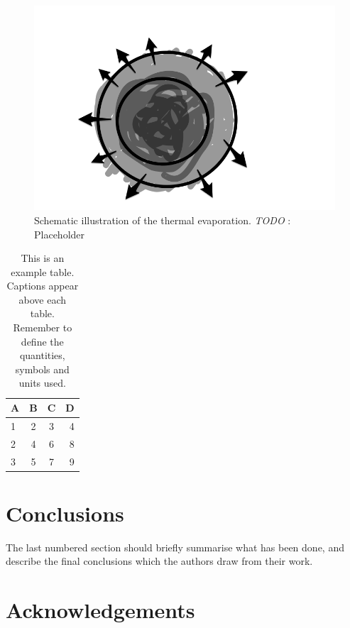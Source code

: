 \documentclass[a4paper,fleqn,usenatbib]{mnras}
\newcommand{\todo}[3]{{\color{#2}\emph{#1}: #3}}
\newcommand{\jtodo}[1]{\todo{TODO }{red}{#1}}
\begin{document}
\begin{figure}
	\includegraphics[width=\columnwidth]{figures/Thermal_escape.png}
    \caption{Schematic illustration of the thermal evaporation. \jtodo{Placeholder}}
    \label{fig:example_figure}
\end{figure}

\begin{table}
	\centering
	\caption{This is an example table. Captions appear above each table.
	Remember to define the quantities, symbols and units used.}
	\label{tab:example_table}
	\begin{tabular}{lccr} %
		\hline
		A & B & C & D\\
		\hline
		1 & 2 & 3 & 4\\
		2 & 4 & 6 & 8\\
		3 & 5 & 7 & 9\\
		\hline
	\end{tabular}
\end{table}


\section{Conclusions}

The last numbered section should briefly summarise what has been done, and describe
the final conclusions which the authors draw from their work.

\section*{Acknowledgements}
\end{document}
